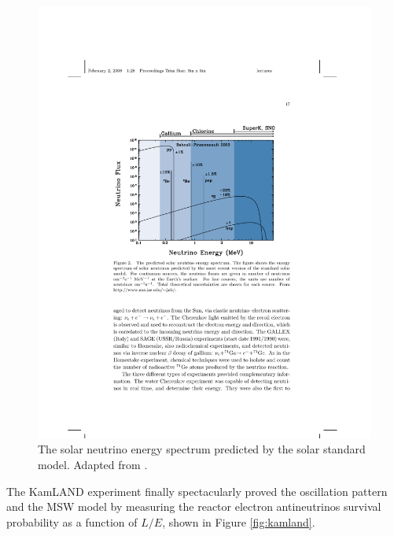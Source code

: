 \begin{figure}[htbp]
    \centering
    \includegraphics[width=0.75\linewidth]{figures/solar.pdf}
    \caption{The solar neutrino energy spectrum predicted by the solar standard model. Adapted from \cite{Bahcall:2000nu}.}
    \label{fig:solar}
\end{figure}

The KamLAND experiment finally spectacularly proved the oscillation pattern and the MSW model by measuring the reactor electron antineutrinos survival probability as a function of $L/E$, shown in Figure \ref{fig:kamland}. 


